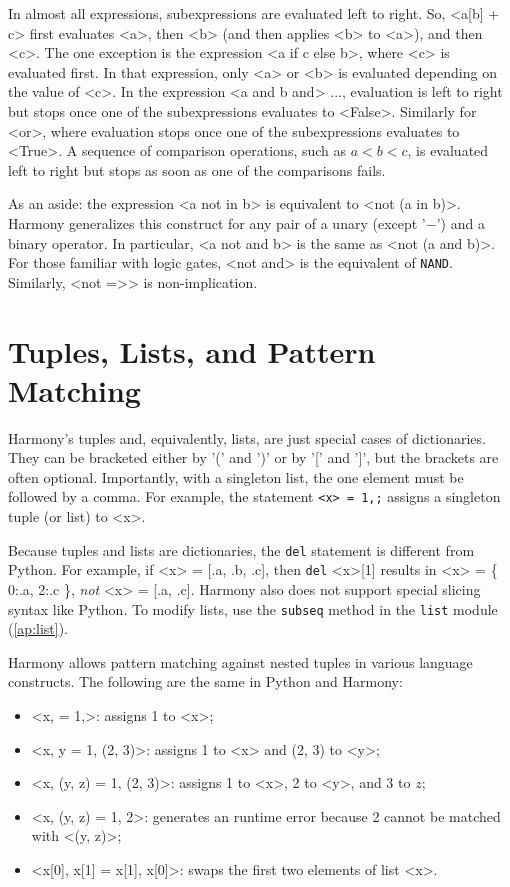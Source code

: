 \documentclass{report}
\begin{document}
In almost all expressions, subexpressions are evaluated left to right.
So, <{a[b] + c}>
first evaluates <{a}>, then <{b}> (and then applies <{b}> to <{a}>), and then <{c}>.  The one
exception is the expression <{a if c else b}>, where <{c}> is evaluated
first.  In that expression, only <{a}> or <{b}> is evaluated depending on the value of <{c}>.
In the expression <{a and b and}> $...$, evaluation is left
to right but stops once one of the subexpressions evaluates to <{False}>.
Similarly for <{or}>, where evaluation stops once one of the subexpressions
evaluates to <{True}>.
A sequence of comparison operations, such as $a < b < c$, is evaluated left to right
but stops as soon as one of the comparisons fails.

As an aside:
the expression <{a not in b}> is equivalent to <{not (a in b)}>.
Harmony generalizes this construct for any pair of a unary (except '$-$') and a binary operator.
In particular, <{a not and b}> is the same as <{not (a and b)}>.  
For those familiar with logic gates, <{not and}> is the equivalent of \texttt{NAND}.
Similarly, <{not =>}> is non-implication.

\section{Tuples, Lists, and Pattern Matching}

Harmony's tuples and, equivalently, lists, are just special cases of dictionaries.
They can be bracketed either by '(' and ')' or by '[' and ']', but
the brackets are often optional.  Importantly, with a singleton list, the
one element must be followed by a comma.
For example, the statement \texttt{<{x}> = 1,;} assigns a singleton tuple (or list) to <{x}>.

Because tuples and lists are dictionaries, the \texttt{del} statement is
different from Python.  For example, if <{x}> = [.a, .b, .c], then
\texttt{del} <{x}>[1] results in <{x}> = \{ 0:.a, 2:.c \}, \emph{not}
<{x}> = [.a, .c].
Harmony also does not support special slicing syntax like Python.
To modify lists, use the \texttt{subseq} method in the \texttt{list} module
(\autoref{ap:list}).

Harmony allows pattern matching against nested tuples in various
language constructs.
%
The following are the same in Python and Harmony:
\begin{itemize}
\item <{x, = 1,}>: assigns 1 to <{x}>;
\item <{x, y = 1, (2, 3)}>: assigns 1 to <{x}> and (2, 3) to <{y}>;
\item <{x, (y, z) = 1, (2, 3)}>: assigns 1 to <{x}>, 2 to <{y}>, and
3 to $z$;
\item <{x, (y, z) = 1, 2}>: generates an runtime error because 2 cannot
be matched with <{(y, z)}>;
\item <{x[0], x[1] = x[1], x[0]}>: swaps the first two elements of list <{x}>.
\end{itemize}
\end{document}

